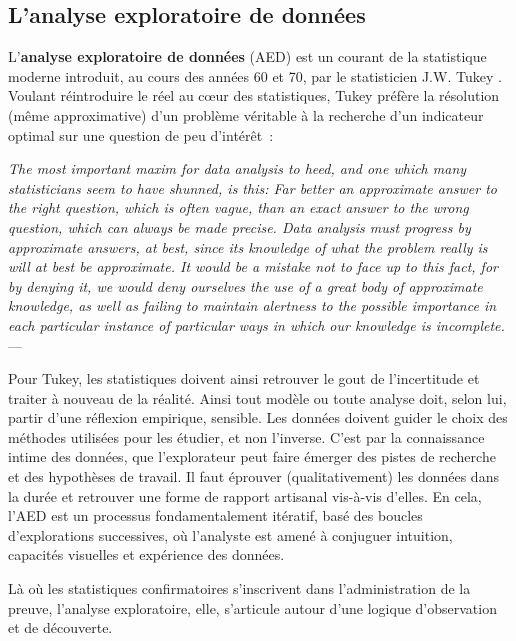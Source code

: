 \documentclass[symmetric,justified,marginals=raggedouter]{tufte-book}
\begin{document}
\subsection{L'analyse exploratoire de données}

\noindent L'\textbf{analyse exploratoire de données} (AED) est un courant de la statistique moderne introduit, au cours des années 60 et 70, par le statisticien J.W. Tukey \citep{tukey_exploratory_1977}. Voulant réintroduire le réel au cœur des statistiques, Tukey préfère la résolution (même approximative) d'un problème véritable à la recherche d'un indicateur optimal sur une question de peu d'intérêt~:\\

\begin{fullwidth}
\og\textit{The most important maxim for data analysis to heed, and one which many statisticians seem to have shunned, is this: Far better an approximate answer to the right question, which is often vague, than an exact answer to the wrong question, which can always be made precise. Data analysis must progress by approximate answers, at best, since its knowledge of what the problem really is will at best be approximate. It would be a mistake not to face up to this fact, for by denying it, we would deny ourselves the use of a great body of approximate knowledge, as well as failing to maintain alertness to the possible importance in each particular instance of particular ways in which our knowledge is incomplete.}\fg{} --- \citep[p.13-14]{tukey_future_1962}\\
\end{fullwidth}

\noindent Pour Tukey, les statistiques doivent ainsi retrouver le gout de l'in\-certitude et traiter à nouveau de la réalité. Ainsi tout modèle ou toute analyse doit, selon lui, partir d'une réflexion empirique, sensible. Les données doivent guider le choix des méthodes utilisées pour les étudier, et non l'inverse. C'est par la connaissance intime des données, que l'explorateur peut faire émerger des pistes de recherche et des hypothèses de travail. Il faut éprouver (qualitativement) les données dans la durée et retrouver une forme de rapport artisanal vis-à-vis d'elles. En cela, l'AED est un processus fondamentalement itératif, basé des boucles d'explorations successives, où l'analyste est amené à conjuguer intuition, capacités visuelles et expérience des données.

Là où les statistiques confirmatoires s'inscrivent dans l'administra\-tion de la preuve, l'analyse exploratoire, elle, s'articule autour d'une logique d'observation et de découverte.  
\end{document}
